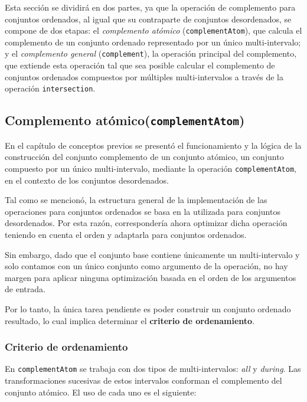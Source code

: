 Esta sección se dividirá en dos partes, ya que la operación de complemento para conjuntos ordenados, al igual que su contraparte de conjuntos desordenados, se compone de dos etapas: el \textit{complemento atómico} (\texttt{complementAtom}), que calcula el complemento de un conjunto ordenado representado por un único multi-intervalo; y el \textit{complemento general} (\texttt{complement}), la operación principal del complemento, que extiende esta operación tal que sea posible calcular el complemento de conjuntos ordenados compuestos por múltiples multi-intervalos a través de la operación \texttt{intersection}.

\subsection{Complemento atómico(\texttt{complementAtom})}

En el capítulo de conceptos previos se presentó el funcionamiento y la lógica de la construcción del conjunto complemento de un conjunto atómico, un conjunto compuesto por un único multi-intervalo, mediante la operación \texttt{complementAtom}, en el contexto de los conjuntos desordenados.

Tal como se mencionó, la estructura general de la implementación de las operaciones para conjuntos ordenados se basa en la utilizada para conjuntos desordenados. Por esta razón, correspondería ahora optimizar dicha operación teniendo en cuenta el orden y adaptarla para conjuntos ordenados.

Sin embargo, dado que el conjunto base contiene únicamente un multi-intervalo y solo contamos con un único conjunto como argumento de la operación, no hay margen para aplicar ninguna optimización basada en el orden de los argumentos de entrada. 

Por lo tanto, la única tarea pendiente es poder construir un conjunto ordenado resultado, lo cual implica determinar el \textbf{criterio de ordenamiento}.

\subsubsection{Criterio de ordenamiento}

En \texttt{complementAtom} se trabaja con dos tipos de multi-intervalos: \textit{all} y \textit{during}. Las transformaciones sucesivas de estos intervalos conforman el complemento del conjunto atómico. El uso de cada uno es el siguiente:

